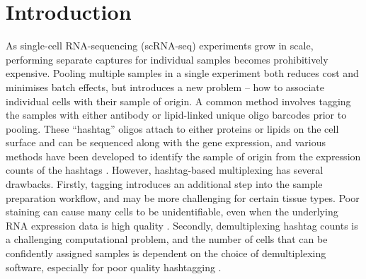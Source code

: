 \documentclass[unnumsec,webpdf,modern,large]{oup-authoring-template}
\begin{document}
	
		\maketitle
	
		\section{Introduction}
	\label{sec:introduction}
	
	As single-cell RNA-sequencing (scRNA-seq) experiments grow in scale, performing separate captures for individual samples becomes prohibitively expensive. 
	Pooling multiple samples in a single experiment both reduces cost and minimises batch effects, but introduces a new problem – how to associate individual cells with their sample of origin. 
	A common method involves tagging the samples with either antibody or lipid-linked unique oligo barcodes prior to pooling. 
	These ``hashtag'' oligos attach to either proteins or lipids on the cell surface and can be sequenced along with the gene expression, and various methods have been developed to identify the sample of origin from the expression counts of the hashtags 
	\citep{Howitt2023}.
	However, hashtag-based multiplexing has several drawbacks. 
	Firstly, tagging introduces an additional step into the sample preparation workflow, and may be more challenging for certain tissue types. 
	Poor staining can cause many cells to be unidentifiable, even when the underlying RNA expression data is high quality 
	\citep{Brown2024}. 
	Secondly, demultiplexing hashtag counts is a challenging computational problem, and the number of cells that can be confidently assigned samples is dependent on the choice of demultiplexing software, especially for poor quality hashtagging 
	\citep{Howitt2023}.
	
\end{document}
